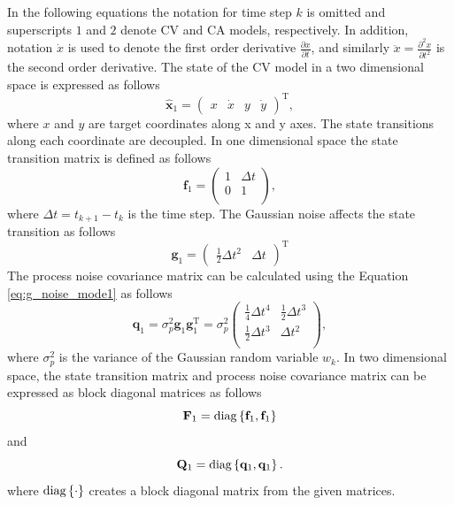 \documentclass[english, 12pt, a4paper, elec, utf8, a-1b, online]{aaltothesis}
\renewcommand{\vec}[1]{\mathbf{#1}}
\newcommand{\transpose}[1]{#1^\text{T}}
\newcommand{\dt}{\Delta t}
\begin{document}
In the following equations the notation for time step $k$ is omitted and superscripts $1$ and $2$ denote CV and CA models, respectively. In addition, notation $\dot{x}$ is used to denote the first order derivative $\frac{\partial x}{\partial t}$, and similarly $\ddot{x}=\frac{\partial^2 x}{\partial t^2}$ is the second order derivative.
The state of the CV model in a two dimensional space is expressed as follows
\begin{equation}\label{eq:x_mode1}
    \hat{\mathbf{x}}_1 =
        \transpose{
        \begin{pmatrix}
            x & \dot{x} & y & \dot{y}
    \end{pmatrix}},
\end{equation}
where $x$ and $y$ are target coordinates along x and y axes. 
The state transitions along each coordinate are decoupled.
In one dimensional space the state transition matrix is defined as follows
\begin{equation}\label{eq:f_mode1}
    \vec{f}_1 =
    \begin{pmatrix}
        1 & \dt \\
        0 & 1  \\
    \end{pmatrix},
\end{equation}
where $\dt=t_{k+1} - t_k$ is the time step.
The Gaussian noise affects the state transition as follows
\begin{equation}\label{eq:g_noise_mode1}
\vec{g}_1 =\transpose{\begin{pmatrix}
        \frac{1}{2} \dt^2 & \dt
    \end{pmatrix}}
\end{equation}
The process noise covariance matrix can be calculated using the Equation \eqref{eq:g_noise_mode1} as follows  
\begin{equation}
    \vec{q}_1 = \sigma_p^2 \vec{g}_1 \transpose{\vec{g}_1}
    = \sigma_p^2
    \begin{pmatrix}
        \frac{1}{4} \dt^4 & \frac{1}{2} \dt^3 \\ 
        \frac{1}{2} \dt^3 & \dt^2 \\ 
    \end{pmatrix},
\end{equation}
where $\sigma_p^2$ is the variance of the Gaussian random variable $w_k$.
In two dimensional space, the state transition matrix and process noise covariance matrix can be expressed as block diagonal matrices as follows 
\begin{equation}\label{eq:F_mode1}
\vec{F}_1 = \diag{\vec{f}_1, \vec{f}_1}
\end{equation}
and
\begin{equation}
    \vec{Q}_1 = \diag{\vec{q}_1, \vec{q}_1}.
\end{equation}
where $\text{diag}\left\{ \cdot \right\}$ creates a block diagonal matrix from the given matrices.
\end{document}
